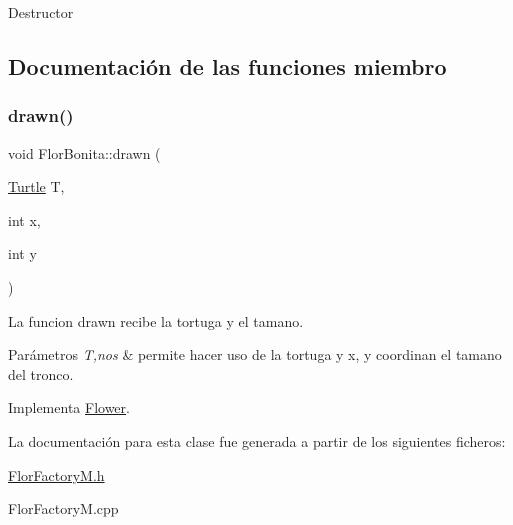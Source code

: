 Destructor 

\subsection{Documentación de las funciones miembro}
\mbox{\label{classFlorBonita_a028f32ccf00bb677f54349afa49657e4}} 
\subsubsection{\texorpdfstring{drawn()}{drawn()}}
{\footnotesize\ttfamily void Flor\+Bonita\+::drawn (\begin{DoxyParamCaption}\item[{\hyperlink{classTurtle}{Turtle}}]{T,  }\item[{int}]{x,  }\item[{int}]{y }\end{DoxyParamCaption})\hspace{0.3cm}{\ttfamily [virtual]}}

La funcion drawn recibe la tortuga y el tamano. 
\begin{DoxyParams}{Parámetros}
{\em T,nos} & permite hacer uso de la tortuga y x, y coordinan el tamano del tronco. \\
\hline
\end{DoxyParams}


Implementa \hyperlink{classFlower_af01eea570f9d02e16cda1d86ee97633c}{Flower}.



La documentación para esta clase fue generada a partir de los siguientes ficheros\+:\begin{DoxyCompactItemize}
\item 
\hyperlink{FlorFactoryM_8h}{Flor\+Factory\+M.\+h}\item 
Flor\+Factory\+M.\+cpp\end{DoxyCompactItemize}
